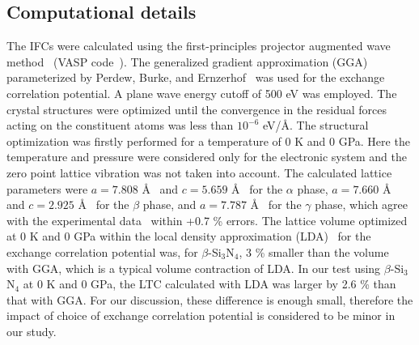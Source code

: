 \documentclass[twocolumn,amsmath,amssymb,a4paper,prb,superscriptaddress,floatfix]{revtex4-1}
\begin{document}
\subsection{Computational details}
The IFCs were calculated using the first-principles projector
augmented wave method~\cite{paw} (VASP code~\cite{vasp-1996,vasp-1995,
vasp-1999}). The generalized gradient approximation (GGA) parameterized by
Perdew, Burke, and Ernzerhof~\cite{pbe} was used for the exchange correlation
potential. A plane wave energy cutoff of 500 eV was employed. The crystal
structures were optimized until the convergence in the residual forces acting
on the constituent atoms was less than $10^{-6}$ eV/\AA. The structural
optimization was firstly performed for a temperature of 0 K and 0 GPa. Here the
temperature and pressure were considered only for the electronic system and the
zero point lattice vibration was not taken into account. The calculated lattice
parameters were $a=7.808$ \AA~ and $c=5.659$ \AA~ for the $\alpha$ phase,
$a=7.660$ \AA~ and $c=2.925$ \AA~ for the $\beta$ phase, and $a=7.787$ \AA~
for the $\gamma$ phase, which agree with the experimental
data~\cite{yashima,boulay,paszkowicz-gSi3N4} within +0.7 \% errors. The lattice
volume optimized at 0 K and 0 GPa within the local density approximation
(LDA)~\cite{lda} for the exchange correlation potential was, for
$\beta$-Si$_3$N$_4$, 3 \% smaller than the volume with GGA, which is a typical
volume contraction of LDA. In our test using $\beta$-Si$_3$N$_4$ at 0 K and 0
GPa, the LTC calculated with LDA was larger by 2.6 \% than that with GGA. For
our discussion, these difference is enough small, therefore the impact of
choice of exchange correlation potential is considered to be minor in our
study.
\end{document}

